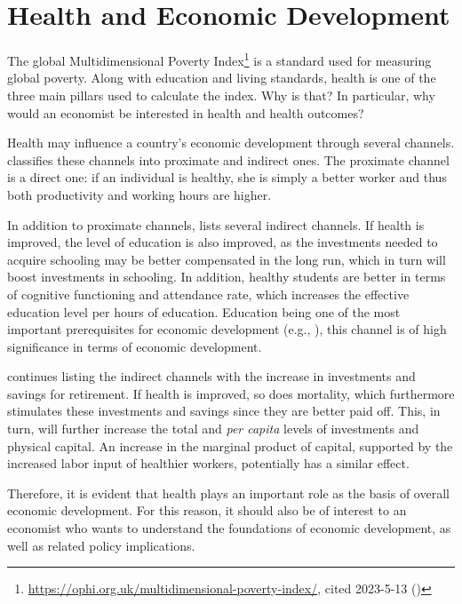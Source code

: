 \documentclass[12pt,a4paper,notitlepage]{article}
\begin{document}
\newpage
\section{Health and Economic Development} \label{sec:literature}

The global Multidimensional Poverty Index\footnote{\url{https://ophi.org.uk/multidimensional-poverty-index/}, cited 2023-5-13 (\citet{Alkire:2022})} is a standard used for measuring global poverty. Along with education and living standards, health is one of the three main pillars used to calculate the index. Why is that? In particular, why would an economist be interested in health and health outcomes?

Health may influence a country's economic development through several channels. \citet{Weil2007} classifies these channels into proximate and indirect ones. The proximate channel is a direct one: if an individual is healthy, she is simply a better worker and thus both productivity and working hours are higher.

In addition to proximate channels, \citet{Weil2007} lists several indirect channels. If health is improved, the level of education is also improved, as the investments needed to acquire schooling may be better compensated in the long run, which in turn will boost investments in schooling. In addition, healthy students are better in terms of cognitive functioning and attendance rate, which increases the effective education level per hours of education. Education being one of the most important prerequisites for economic development (e.g., \citet{Schultz:1961}), this channel is of high significance in terms of economic development.

\citet{Weil2007} continues listing the indirect channels with the increase in investments and savings for retirement. If health is improved, so does mortality, which furthermore stimulates these investments and savings since they are better paid off. This, in turn, will further increase the total and \textit{per capita} levels of investments and physical capital. An increase in the marginal product of capital, supported by the increased labor input of healthier workers, potentially has a similar effect.

Therefore, it is evident that health plays an important role as the basis of overall economic development. For this reason, it should also be of interest to an economist who wants to understand the foundations of economic development, as well as related policy implications.
\end{document}
